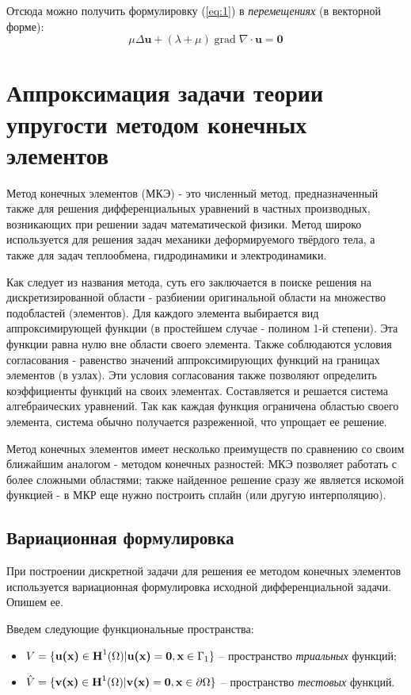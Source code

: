 \documentclass[a4paper, 14pt]{extreport}
\DeclareMathOperator{\grad}{grad}
\begin{document}
Отсюда  можно получить формулировку (\ref{eq:1}) в \textit{перемещениях} (в векторной форме):
\begin{equation}
	\label{eq: 2}
	\mu\Delta\textbf{u} + (\lambda + \mu)\grad\!\nabla\!\cdot\!\textbf{u} = \textbf{0}
\end{equation}

\chapter{Аппроксимация задачи теории упругости методом конечных элементов}

Метод конечных элементов (МКЭ) - это численный метод, 
предназначенный также для решения 
дифференциальных уравнений в частных производных, 
возникающих при решении задач математической физики. 
Метод широко используется для решения задач механики деформируемого твёрдого тела, а также для задач теплообмена, 
гидродинамики и электродинамики.

Как следует из названия метода, суть его заключается в поиске 
решения на дискретизированной области - разбиении 
оригинальной области на множество подобластей (элементов).
Для каждого элемента выбирается вид аппроксимирующей
функции (в простейшем случае - полином 1-й степени).
Эта функции равна нулю вне области своего элемента.
Также соблюдаются условия согласования - равенство значений 
аппроксимирующих функций на границах элементов (в узлах). 
Эти условия согласования также позволяют определить 
коэффициенты функций на своих элементах.
Составляется и решается система алгебраических уравнений.
Так как каждая функция ограничена областью своего элемента, 
система обычно получается разреженной, что упрощает ее 
решение.

Метод конечных элементов имеет несколько преимуществ 
по сравнению со своим ближайшим аналогом - методом 
конечных разностей: МКЭ позволяет работать с более сложными 
областями; также найденное решение сразу же является 
искомой функцией - в МКР еще нужно построить сплайн 
(или другую интерполяцию).


\section{ Вариационная формулировка}
При построении дискретной задачи для решения ее методом конечных элементов 
используется вариационная формулировка исходной дифференциальной задачи.
Опишем ее.

Введем следующие функциональные пространства:
\begin{itemize}
	\item $V = \{ \textbf{u(\textbf{x})} \in \textbf{H}^1(\Omega) \vert \textbf{u(\textbf{x})} = \textbf{0}, \textbf{x} \in \Gamma_1 \}$ --
	пространство \textit{триальных} функций;
	\item $\hat{V} = \{ \textbf{v(\textbf{x})} \in \textbf{H}^1(\Omega) \vert \textbf{v(\textbf{x})} = \textbf{0}, \textbf{x} \in \partial\Omega \}$ --
	пространство \textit{тестовых} функций.	
\end{itemize}
\end{document}
